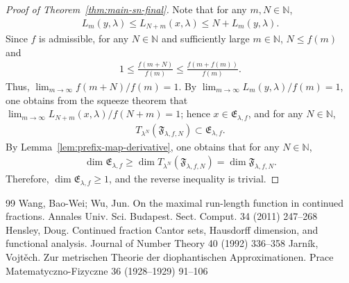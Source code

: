 \documentclass[10pt,a4paper]{amsart}
\begin{document}
\begin{proof}[Proof of Theorem~\ref{thm:main-sn-final}]
Note that for any $m,N\in\mathbb{N}$,
\begin{align*}
    L_m(y,\lambda)
    \leq L_{N+m}(x,\lambda)
    \leq N+L_m(y,\lambda).
\end{align*}
Since $f$ is admissible, for any $N\in\mathbb{N}$ and sufficiently large $m\in\mathbb{N}$, $N\leq f(m)$ and 
\begin{align*}
    1\leq\frac{f(m+N)}{f(m)}\leq\frac{f(m+f(m))}{f(m)}.
\end{align*}
Thus, $\lim_{m\to\infty}f(m+N)/f(m)=1$. By $\lim_{m\to\infty}{L_m(y,\lambda)}/{f(m)}=1$, one obtains from the squeeze theorem that $\lim_{m\to\infty}{L_{N+m}(x,\lambda)}/{f(N+m)}=1$; hence $x\in{\mathfrak E}_{\lambda,f}$, and for any $N\in\mathbb{N}$,
\begin{align*}
    T_{\lambda^N}\!\left(\mathfrak{F}_{\lambda,f,N}\right)
    \subset{\mathfrak E}_{\lambda,f}.
\end{align*}
By Lemma~\ref{lem:prefix-map-derivative}, one obtains that for any $N\in\mathbb{N}$, 
\begin{align*}
    \dim{{\mathfrak E}_{\lambda,f}}
    \geq \dim{T_{\lambda^N}\!\left(\mathfrak{F}_{\lambda,f,N}\right)}
    = \dim{\mathfrak{F}_{\lambda,f,N}}.
\end{align*}
Therefore, $\dim{\mathfrak{E}_{\lambda,f}}\geq1$, and the reverse inequality is trivial.
\end{proof}


\begin{thebibliography}{99}
 Wang, Bao-Wei; Wu, Jun. On the maximal run-length function in continued fractions. Annales Univ. Sci. Budapest. Sect. Comput. 34 (2011) 247--268
 Hensley, Doug. Continued fraction {Cantor} sets, {Hausdorff} dimension, and functional analysis. Journal of Number Theory 40 (1992) 336--358
 Jarn{\'i}k, Vojt{\v e}ch. Zur metrischen Theorie der diophantischen Approximationen. Prace Matematyczno-Fizyczne 36 (1928--1929) 91--106
\end{thebibliography}
\end{document}
